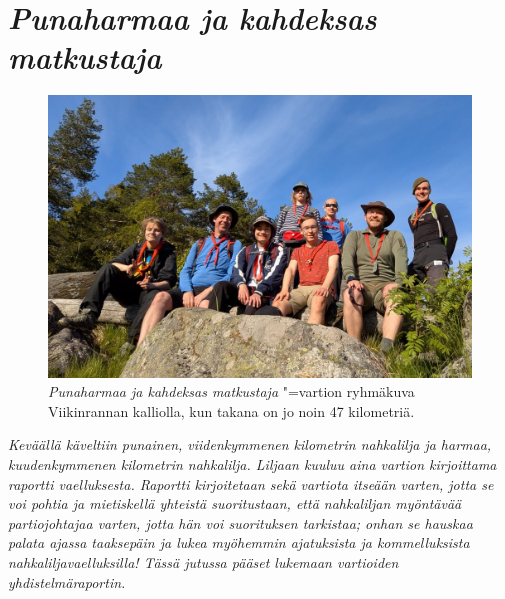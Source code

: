 \section{\textit{Punaharmaa ja kahdeksas matkustaja}}

\thispagestyle{empty}

\begin{figure}[!h]
\centering\includegraphics[width=\textwidth]{assets/liljaryhma.jpg}
\caption{\textit{Punaharmaa ja kahdeksas matkustaja} "=vartion ryhmäkuva 
Viikinrannan kalliolla, kun takana on jo noin 47 kilometriä.}
\end{figure}

\noindent\textit{Keväällä käveltiin punainen, viidenkymmenen kilometrin 
nahkalilja ja harmaa, kuudenkymmenen kilometrin nahkalilja. Liljaan kuuluu aina 
vartion kirjoittama raportti vaelluksesta. Raportti kirjoitetaan sekä vartiota 
itseään varten, jotta se voi pohtia ja mietiskellä yhteistä suoritustaan, 
että nahkaliljan myöntävää partiojohtajaa varten, jotta hän voi 
suorituksen tarkistaa; onhan se hauskaa palata ajassa taaksepäin ja lukea 
myöhemmin ajatuksista ja kommelluksista nahkaliljavaelluksilla! Tässä 
jutussa pääset lukemaan vartioiden yhdistelmäraportin.}

